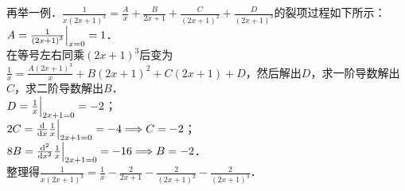 \documentclass{ctexbook}
\newcommand*{\dif}{\mathop{}\!\mathrm{d}}
\begin{document}
再举一例．$\frac{1}{x\left(2x+1\right)^{3}}=\frac{A}{x}+\frac{B}{2x+1}+\frac{C}{\left(2x+1\right)^{2}}+\frac{D}{\left(2x+1\right)^{3}}$的裂项过程如下所示：\\
$A=\frac{1}{\left(2x+1\right)^{3}}\Big{|}_{x=0}=1$．\\
在等号左右同乘$\left(2x+1\right)^{3}$后变为$\frac{1}{x}=\frac{A\left(2x+1\right)^{3}}{x}+B\left(2x+1\right)^{2}+C\left(2x+1\right)+D$，然后解出$D$，求一阶导数解出$C$，求二阶导数解出$B$．\\
$D=\frac{1}{x}\Big{|}_{2x+1=0}=-2$；\\
$2C=\frac{\mathrm{d}}{\dif{x}}\frac{1}{x}\Big{|}_{2x+1=0}=-4\Longrightarrow C=-2$；\\
$8B=\frac{\mathrm{d}^{2}}{\dif{x}^{2}}\frac{1}{x}\Big{|}_{2x+1=0}=-16\Longrightarrow B=-2$．\\
整理得$\frac{1}{x\left(2x+1\right)^{3}}=\frac{1}{x}-\frac{2}{2x+1}-\frac{2}{\left(2x+1\right)^{2}}-\frac{2}{\left(2x+1\right)^{3}}$．\par
\end{document}
